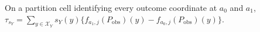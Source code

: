 On a partition cell identifying every outcome coordinate at \(a_0\) and \(a_1\), \(\tau_{s_Y}=\sum_{y\in\mathcal X_Y}s_Y(y)\{f_{a_1,j}(P_{\mathrm{obs}})(y)-f_{a_0,j}(P_{\mathrm{obs}})(y)\}\).